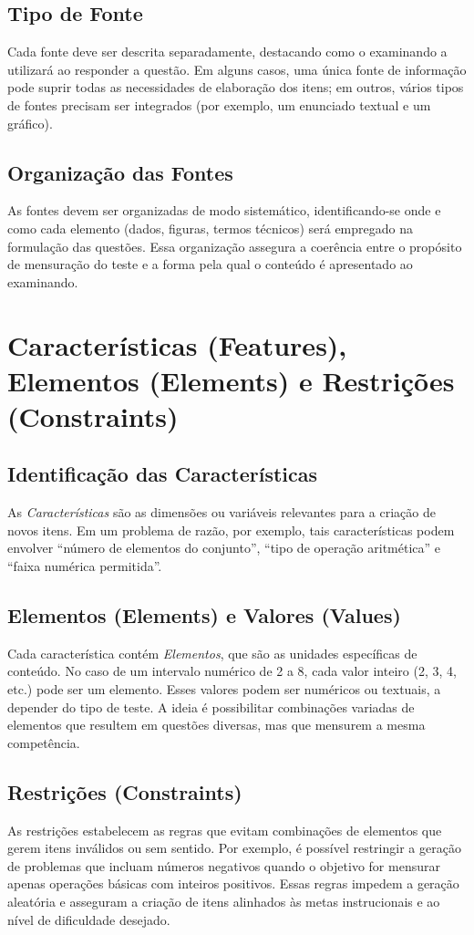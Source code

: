 \subsection{Tipo de Fonte}
Cada fonte deve ser descrita separadamente, destacando como o examinando a utilizará ao responder a questão. Em alguns casos, uma única fonte de informação pode suprir todas as necessidades de elaboração dos itens; em outros, vários tipos de fontes precisam ser integrados (por exemplo, um enunciado textual e um gráfico).

\subsection{Organização das Fontes}
As fontes devem ser organizadas de modo sistemático, identificando-se onde e como cada elemento (dados, figuras, termos técnicos) será empregado na formulação das questões. Essa organização assegura a coerência entre o propósito de mensuração do teste e a forma pela qual o conteúdo é apresentado ao examinando.

\section{Características (Features), Elementos (Elements) e Restrições (Constraints)}
\subsection{Identificação das Características}
As \emph{Características} são as dimensões ou variáveis relevantes para a criação de novos itens. Em um problema de razão, por exemplo, tais características podem envolver “número de elementos do conjunto”, “tipo de operação aritmética” e “faixa numérica permitida”.

\subsection{Elementos (Elements) e Valores (Values)}
Cada característica contém \emph{Elementos}, que são as unidades específicas de conteúdo. No caso de um intervalo numérico de 2 a 8, cada valor inteiro (2, 3, 4, etc.) pode ser um elemento. Esses valores podem ser numéricos ou textuais, a depender do tipo de teste. A ideia é possibilitar combinações variadas de elementos que resultem em questões diversas, mas que mensurem a mesma competência.

\subsection{Restrições (Constraints)}
As restrições estabelecem as regras que evitam combinações de elementos que gerem itens inválidos ou sem sentido. Por exemplo, é possível restringir a geração de problemas que incluam números negativos quando o objetivo for mensurar apenas operações básicas com inteiros positivos. Essas regras impedem a geração aleatória e asseguram a criação de itens alinhados às metas instrucionais e ao nível de dificuldade desejado.


